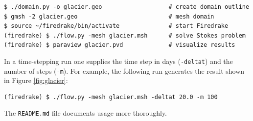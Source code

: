 \documentclass[letterpaper,final,12pt,reqno]{amsart}
\begin{document}
\medskip
\begin{Verbatim}
$ ./domain.py -o glacier.geo                   # create domain outline
$ gmsh -2 glacier.geo                          # mesh domain
$ source ~/firedrake/bin/activate              # start Firedrake
(firedrake) $ ./flow.py -mesh glacier.msh      # solve Stokes problem
(firedrake) $ paraview glacier.pvd             # visualize results
\end{Verbatim}

\medskip
\noindent In a time-stepping run one supplies the time step in days (\texttt{-deltat}) and the number of steps (\texttt{-m}).  For example, the following run generates the result shown in Figure \ref{fig:glacier}:

\medskip
\begin{Verbatim}
(firedrake) $ ./flow.py -mesh glacier.msh -deltat 20.0 -m 100
\end{Verbatim}

\medskip
\noindent The \verb|README.md| file documents usage more thoroughly.
\end{document}
